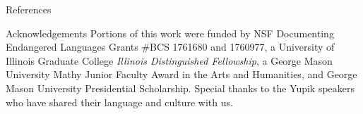 \documentclass[usenames,dvipsnames]{beamer}
\begin{document}
\begin{frame}[fragile]
\begin{columns}[T]
\begin{column}{0.46\textwidth}
\begin{block}{References}
\tiny
\nocite{*}

%

\end{block}
\begin{block}{Acknowledgements}
\tiny
Portions of this work were funded by NSF Documenting Endangered Languages Grants \#BCS 1761680 and 1760977, a University of Illinois Graduate College \textit{Illinois Distinguished Fellowship}, a George Mason University Mathy Junior Faculty Award in the Arts and Humanities, and George Mason University Presidential Scholarship. Special thanks to the Yupik speakers who have shared their language and culture with us.
\end{block}
\end{column}

\end{columns}

\end{frame}
\end{document}

